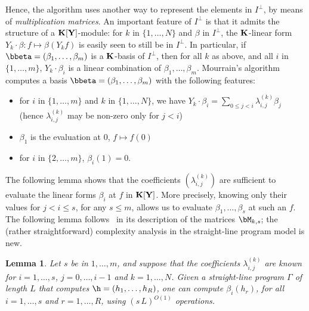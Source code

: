 \documentclass[12pt]{article}
\newtheorem{lemma}[definition]{Lemma}
\begin{document}
Hence, the algorithm uses another way to represent the elements in
$I^{\perp}$, by means of {\em multiplication matrices}. An important
feature of $I^{\perp}$ is that it admits the structure of a
$\mathbf{K}[\mathbf{Y}]$-module: for $k$ in $\{1,\dots,N\}$ and $\beta$ in
$I^{\perp}$, the $\mathbf{K}$-linear form $Y_k \cdot \beta: f \mapsto
\beta(Y_k f)$ is easily seen to still be in $I^{\perp}$.  In
particular, if $\bbeta=(\beta_1,\dots,\beta_m)$ is a $\mathbf{K}$-basis of
$I^{\perp}$, then for all $k$ as above, and all $i$ in
$\{1,\dots,m\}$, $Y_k \cdot \beta_i$ is a linear combination of
$\beta_1,\dots,\beta_m$. Mourrain's algorithm computes a
basis $\bbeta=(\beta_1,\dots,\beta_m)$ with the following features:
\begin{itemize}
\item for $i$ in $\{1,\dots,m\}$ and $k$ in $\{1,\dots,N\}$, we have
  $Y_k \cdot \beta_i=\sum_{0 \le j < i} \lambda^{(k)}_{i,j} \beta_j$
  (hence $\lambda^{(k)}_{i,j}$ may be non-zero 
  only for $j<i$)
\item $\beta_1$ is the evaluation at $0$, $f \mapsto f(0)$
\item for $i$ in $\{2,\dots,m\}$, $\beta_i(1)=0$.
\end{itemize}
The following lemma shows that the coefficients $(\lambda^{(k)}_{i,j})$
are sufficient to evaluate  the linear forms $\beta_i$ at $f$ in
$\mathbf{K}[\mathbf{Y}]$. More precisely, knowing only their values for $j < i \le s$,
for any $s \le m$, allows us to evaluate $\beta_1,\dots,\beta_s$ at such an $f$.
The following lemma follows~\cite{Mourrain97} in its description
of the matrices $\bM_{k,s}$; the (rather straightforward) complexity analysis 
in the straight-line program model is new.
\begin{lemma}\label{lemma:evalbeta}
   Let $s$ be in $1,\dots,m$, and suppose that the coefficients
  $\lambda^{(k)}_{i,j}$ are known for $i=1,\dots,s$, $j=0,\dots,i-1$
  and $k=1,\dots,N$. Given a straight-line program $\Gamma$ of length
  $L$ that computes $\h=(h_1,\dots,h_R)$, one can compute
  $\beta_i(h_r)$, for all $i=1,\dots,s$ and $r=1,\dots,R$, using
  $(s\,L)^{O(1)}$ operations.
\end{lemma}
\end{document}
